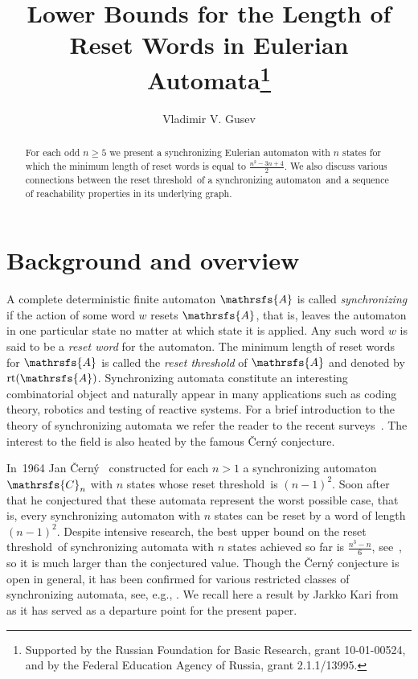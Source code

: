 \documentclass[11pt]{llncs}
\newcommand{\san}{synchronizing automaton}
\newcommand{\reth}{reset threshold}
\DeclareMathOperator{\rt}{rt}
\begin{document}
\title{Lower Bounds for the Length of Reset Words in Eulerian Automata\thanks{Supported
by the Russian Foundation for Basic Research, grant 10-01-00524, and by the
Federal Education Agency of Russia, grant 2.1.1/13995.}}
\author{Vladimir V. Gusev}

\maketitle

\begin{abstract}
For each odd $n\ge 5$ we present a synchronizing Eulerian automaton with $n$
states for which the minimum length of reset words is equal to $\frac{n^2 - 3n
+ 4}{2}$. We also discuss various connections between the \reth\ of a \san\ and
a sequence of reachability properties in its underlying graph.
\end{abstract}


\section{Background and overview}
\label{intro}


A complete deterministic finite automaton $\mathrsfs{A}$ is called
\emph{synchronizing} if the action of some word $w$ resets $\mathrsfs{A}$, that
is, leaves the automaton in one particular state no matter at which state it is
applied. Any such word $w$ is said to be a \emph{reset word} for the automaton.
The minimum length of reset words for $\mathrsfs{A}$ is called the \emph{\reth}
of $\mathrsfs{A}$ and denoted by $\rt(\mathrsfs{A})$. Synchronizing automata
constitute an interesting combinatorial object and naturally appear in many
applications such as coding theory, robotics and testing of reactive systems.
For a brief introduction to the theory of synchronizing automata we refer the
reader to the recent surveys~\cite{Sa05,Vo08}. The interest to the field is
also heated by the famous \v{C}ern\'{y} conjecture.

In~1964 Jan \v{C}ern\'{y}~\cite{Ce64} constructed for each $n>1$ a
synchronizing automaton $\mathrsfs{C}_n$ with $n$ states whose \reth\ is
$(n-1)^2$. Soon after that he conjectured that these automata represent the
worst possible case, that is, every synchronizing automaton with $n$ states can
be reset by a word of length $(n-1)^2$. Despite intensive research, the best
upper bound on the \reth\ of synchronizing automata with $n$ states achieved so
far is $\frac{n^3-n}6$, see~\cite{Pi83}, so it is much larger than the
conjectured value. Though the \v{C}ern\'{y} conjecture is open in general, it
has been confirmed for various restricted classes of synchronizing automata,
see, e.g., \cite{Ep90,Du98,Ka03,Tr07,Vo09}. We recall here a result by Jarkko
Kari from~\cite{Ka03} as it has served as a departure point for the present
paper.
\end{document}
